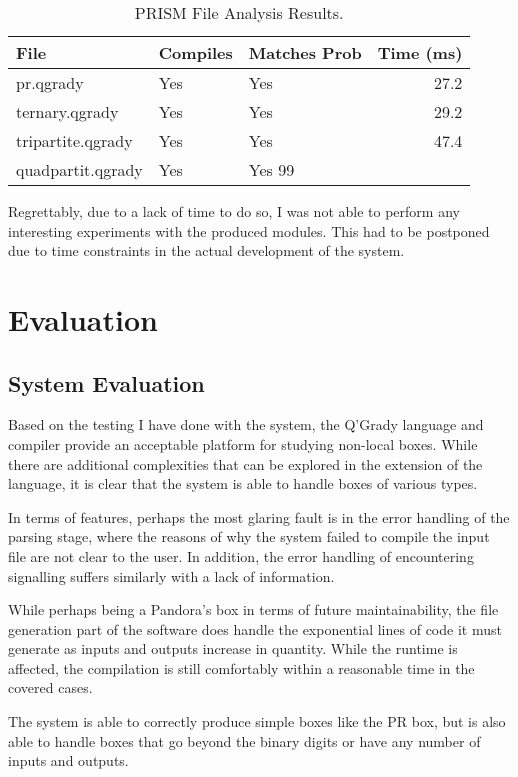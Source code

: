\documentclass[report.tex]{subfiles}
\begin{document}
\begin{table}[H]
  \centering
  \begin{tabular}{l | l | l | r}
    File & Compiles & Matches Prob & Time (ms)\\
    \hline
    pr.qgrady & Yes & Yes & 27.2 \\
    ternary.qgrady & Yes & Yes & 29.2 \\
    tripartite.qgrady & Yes & Yes & 47.4 \\
    quadpartit.qgrady & Yes & Yes 99 &
  \end{tabular}
  \caption{PRISM File Analysis Results.}
  \label{tab:prism_result}
\end{table}

Regrettably, due to a lack of time to do so, I was not able to perform any
interesting experiments with the produced modules. This had to be postponed
due to time constraints in the actual development of the system.

\section{Evaluation} %
\label{sec:evaluation}
\subsection{System Evaluation} %
\label{sub:system_evaluation}
Based on the testing I have done with the system, the Q'Grady language and
compiler provide an acceptable platform for studying non-local boxes. While
there are additional complexities that can be explored in the extension of the
language, it is clear that the system is able to handle boxes of various types.

In terms of features, perhaps the most glaring fault is in the error handling of
the parsing stage, where the reasons of why the system failed to compile the
input file are not clear to the user. In addition, the error handling of
encountering signalling suffers similarly with a lack of information.

While perhaps being a Pandora's box in terms of future maintainability, the file
generation part of the software does handle the exponential lines of code it
must generate as inputs and outputs increase in quantity. While the runtime is
affected, the compilation is still comfortably within a reasonable time in the
covered cases.

The system is able to correctly produce simple boxes like the PR box, but is
also able to handle boxes that go beyond the binary digits or have any number
of inputs and outputs.
\end{document}
